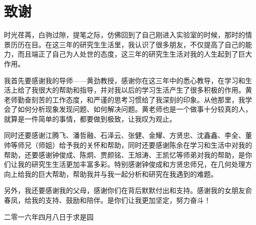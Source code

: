 \chapter{致\ZJUspace{}谢}
时光荏苒，白驹过隙，提笔之际，仿佛回到了自己刚进入实验室的时候，那时的情景历历在目。在这三年的研究生生活里，我认识了很多朋友，不仅提高了自己的能力，而且端正了自己为人处世的态度，这三年的研究生生活对我的人生起到了巨大作用。

我首先要感谢我的导师——黄劲教授，感谢你在这三年中的悉心教导，在学习和生活上给了我很大的帮助和指导，并对我以后的学习生活产生了很多积极的作用。黄老师勤奋刻苦的工作态度，和严谨的思考习惯给了我深刻的印象。从他那里，我学会了如何分析现象发现问题、如何解决问题。黄老师也是一个做事十分较真的人，就算是一件简单的事情，都要做到极致，让我叹为观止。

同时还要感谢江腾飞、潘哲融、石泽云、张健、金耀、方贤忠、沈鑫鑫、李全、董帅等师兄（师姐）给予我的关怀和帮助，同时还要感谢陈余在学习和生活中对我的帮助，还要感谢钟俊成、陈炯、贾颜铭、王旭涛、王凯忆等师弟对我的帮助，是你们让我的研究生生活更加丰富多彩。特别感谢钟俊成和方贤忠师兄，在几何处理方向上给我的巨大帮助，帮助我并与我一起分析和研究在我遇到的难题。

另外，我还要感谢我的父母，感谢你们在背后默默付出和支持。感谢我的女朋友俞春凤，给我的支持、鼓励和陪伴。是你们让我更加坚定，努力奋斗！
\vspace{2cm}
\hfill
\begin{minipage}{14em}
    \begin{flushright}
      $\quad$\\
      二零一六年四月八日于求是园\\ %
    \end{flushright}
\end{minipage}
